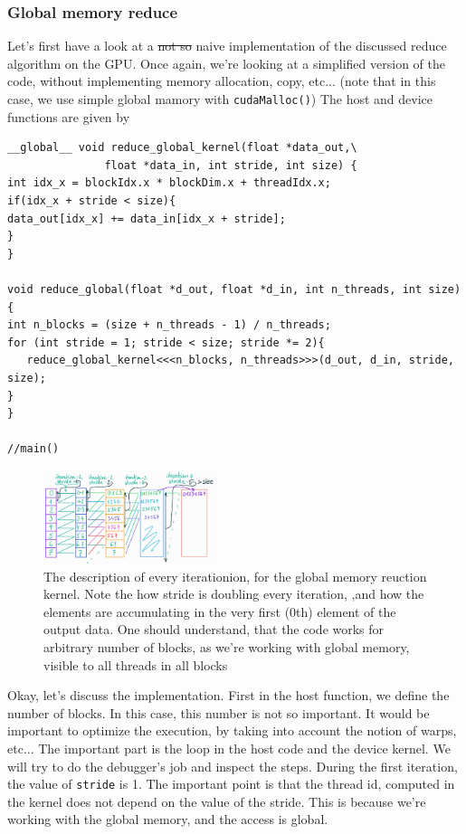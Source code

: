 \documentclass[12pt]{article}
\begin{document}
\subsubsection*{Global memory reduce}
Let's first have a look at a \sout{not so} naive implementation of the discussed reduce algorithm on the GPU.
Once again, we're looking at a simplified version of the code, without implementing memory allocation, copy, etc... 
(note that in this case, we use simple global mamory with \verb|cudaMalloc()|) The host and device functions are given by


\begin{verbatim}
__global__ void reduce_global_kernel(float *data_out,\
               float *data_in, int stride, int size) {
int idx_x = blockIdx.x * blockDim.x + threadIdx.x;
if(idx_x + stride < size){
data_out[idx_x] += data_in[idx_x + stride];
}
}

void reduce_global(float *d_out, float *d_in, int n_threads, int size) {
int n_blocks = (size + n_threads - 1) / n_threads;
for (int stride = 1; stride < size; stride *= 2){
   reduce_global_kernel<<<n_blocks, n_threads>>>(d_out, d_in, stride, size);
}
}

//main()
\end{verbatim}

\begin{figure}
   \vspace{-0.9cm}
   \begin{center}
   \includegraphics[width=0.45\textwidth]{reduce_only_global.jpg}
   \end{center}
   \vspace{-0.5cm}
   \captionsetup{justification=raggedleft}
   \caption{The description of every iterationion, for the global memory 
   reuction kernel. Note the how stride is doubling every iteration, 
   ,and how the elements are accumulating in the very first (0th) element of the output data. 
   One should understand, that the code works for arbitrary number of blocks, as we're working with global 
   memory, visible to all threads in all blocks}
   \label{fig:reduced_global_only}
\end{figure}
Okay, let's discuss the implementation. First in the host function, we define the number of blocks. 
In this case, this number is not so important. It would be important to optimize the execution, 
by taking into account the notion of warps, etc... The important part is the loop in the host code and 
the device kernel. We will try to do the debugger's job and inspect the steps. 
During the first iteration, the value of \verb|stride| is 1. The important point is that the thread id, 
computed in the kernel does not depend on the value of the stride. This is because we're working with the global 
memory, and the access is global.
\end{document}
